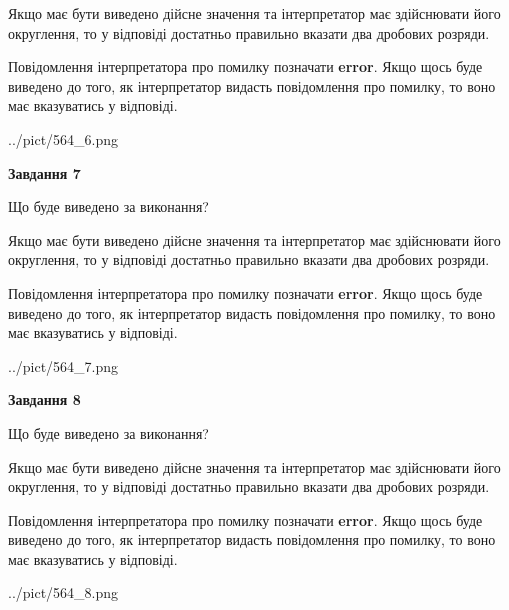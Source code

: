 \documentclass[12pt, ukrainian]{article}
\begin{document}
{\begin {Large}
Якщо має бути виведено дійсне значення та інтерпретатор має здійснювати його округлення, 
то у відповіді достатньо правильно вказати два дробових розряди.

Повідомлення інтерпретатора про помилку позначати \textbf{error}.
Якщо щось буде виведено до того, як інтерпретатор видасть повідомлення про помилку, 
то воно має вказуватись у відповіді. \par

\begin{center}
	{../pict/564_6.png}
\end{center}
\newpage

{\begin {center}\textbf{Завдання 7}\end {center}}\par
Що буде виведено за виконання? \par

Якщо має бути виведено дійсне значення та інтерпретатор має здійснювати його округлення, 
то у відповіді достатньо правильно вказати два дробових розряди.

Повідомлення інтерпретатора про помилку позначати \textbf{error}.
Якщо щось буде виведено до того, як інтерпретатор видасть повідомлення про помилку, 
то воно має вказуватись у відповіді. \par

\begin{center}
	{../pict/564_7.png}
\end{center}
\newpage

{\begin {center}\textbf{Завдання 8}\end {center}}\par
Що буде виведено за виконання? \par

Якщо має бути виведено дійсне значення та інтерпретатор має здійснювати його округлення, 
то у відповіді достатньо правильно вказати два дробових розряди.

Повідомлення інтерпретатора про помилку позначати \textbf{error}.
Якщо щось буде виведено до того, як інтерпретатор видасть повідомлення про помилку, 
то воно має вказуватись у відповіді. \par

\begin{center}
	{../pict/564_8.png}
\end{center}
\newpage


\end{Large}}
\end{document}
